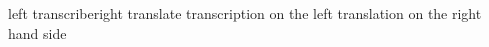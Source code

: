 





\begin{EOAtranscripted}{left transcribe}{right translate}
transcription on the  left
\EOAnewpage
translation on the  right  hand side
\end{EOAtranscripted}


